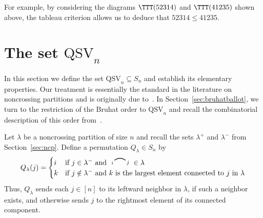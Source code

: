 \documentclass[12pt]{amsart}
\theoremstyle{definition}
\theoremstyle{remark}
\numberwithin{equation}{section}
\newcommand{\QSV}{\mathrm{QSV}}
\newcommand{\edge}[2]{\tikz[scale = 0.75, baseline = -0.2cm]{
\draw (0.1, 0) node[inner sep = 0ex] (a) {};
\node[left, xshift = 0.1cm, yshift = -0.1cm] at (a) {$\scriptstyle #1$};
\draw (0.9, 0)  node[inner sep = 0ex] (b) {};
\node[right, xshift = -0.1cm, yshift = -0.1cm] at (b) {$\scriptstyle #2$};
\draw[thick] (a) to[out = 35, in = 145] (b);}}
\begin{document}
For example, by considering the diagrams $\TTT(52314)$ and $\TTT(41235)$ shown above, the tableau criterion allows us to deduce that $52314 \le 41235$.

\section{The set $\QSV_{n}$}
\label{sec:QSV}

In this section we define the set $\QSV_{n} \subseteq S_n$ and establish its elementary properties.  Our treatment is essentially the standard  in the literature on noncrossing partitions and is originally due to~\cite{Baine}.  In Section~\ref{sec:bruhatballot}, we turn to the restriction of the Bruhat order to $\QSV_{n}$ and recall the combinatorial description of this order from~\cite{GobetWilliams}. 

Let $\lambda$ be a noncrossing partition of size $n$ and recall the sets $\lambda^{+}$ and $\lambda^{-}$ from Section~\ref{sec:ncp}.  
Define a permutation $Q_{\lambda} \in S_{n}$ by 
\[
Q_{\lambda}(j) = \begin{cases} i & \text{if $j \in \lambda^{-}$ and $ \edge{i}{j} \in \lambda$} \\
k & \text{if $j \notin \lambda^{-}$ and $k$ is the largest element connected to $j$ in $\lambda$}
\end{cases}
\]
Thus, $Q_{\lambda}$ sends each $j \in [n]$ to its leftward neighbor in $\lambda$, if such a neighbor exists, and otherwise sends $j$ to the rightmost element of its connected component.  
\end{document}
